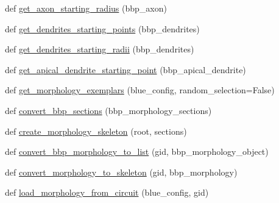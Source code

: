 \begin{DoxyCompactItemize}
\item 
def \hyperlink{classmeshy_1_1neuromorphovis_1_1file_1_1readers_1_1morphology_1_1bbp__reader_1_1BBPReader_aef70df3a247ec4976d1020a63f3874c6}{get\+\_\+axon\+\_\+starting\+\_\+radius} (bbp\+\_\+axon)
\item 
def \hyperlink{classmeshy_1_1neuromorphovis_1_1file_1_1readers_1_1morphology_1_1bbp__reader_1_1BBPReader_afdab627c045a749044be1777552adefa}{get\+\_\+dendrites\+\_\+starting\+\_\+points} (bbp\+\_\+dendrites)
\item 
def \hyperlink{classmeshy_1_1neuromorphovis_1_1file_1_1readers_1_1morphology_1_1bbp__reader_1_1BBPReader_ad09df56212d10b543856fc39b7419e80}{get\+\_\+dendrites\+\_\+starting\+\_\+radii} (bbp\+\_\+dendrites)
\item 
def \hyperlink{classmeshy_1_1neuromorphovis_1_1file_1_1readers_1_1morphology_1_1bbp__reader_1_1BBPReader_aa9c6eaf938e7bf25a5d2f07b74e6e4a2}{get\+\_\+apical\+\_\+dendrite\+\_\+starting\+\_\+point} (bbp\+\_\+apical\+\_\+dendrite)
\item 
def \hyperlink{classmeshy_1_1neuromorphovis_1_1file_1_1readers_1_1morphology_1_1bbp__reader_1_1BBPReader_a20d5f0085d3bb015351792467ae0b86c}{get\+\_\+morphology\+\_\+exemplars} (blue\+\_\+config, random\+\_\+selection=False)
\item 
def \hyperlink{classmeshy_1_1neuromorphovis_1_1file_1_1readers_1_1morphology_1_1bbp__reader_1_1BBPReader_aa026b30f503fcab7f986105ba42a1db3}{convert\+\_\+bbp\+\_\+sections} (bbp\+\_\+morphology\+\_\+sections)
\item 
def \hyperlink{classmeshy_1_1neuromorphovis_1_1file_1_1readers_1_1morphology_1_1bbp__reader_1_1BBPReader_a124b08fc4aa9b6b6eb91278b3bb6f4cf}{create\+\_\+morphology\+\_\+skeleton} (root, sections)
\item 
def \hyperlink{classmeshy_1_1neuromorphovis_1_1file_1_1readers_1_1morphology_1_1bbp__reader_1_1BBPReader_ac3e85441a850ae845261aaa790e1b8af}{convert\+\_\+bbp\+\_\+morphology\+\_\+to\+\_\+list} (gid, bbp\+\_\+morphology\+\_\+object)
\item 
def \hyperlink{classmeshy_1_1neuromorphovis_1_1file_1_1readers_1_1morphology_1_1bbp__reader_1_1BBPReader_ad427e47debb6894980687a308fb0cb1e}{convert\+\_\+morphology\+\_\+to\+\_\+skeleton} (gid, bbp\+\_\+morphology)
\item 
def \hyperlink{classmeshy_1_1neuromorphovis_1_1file_1_1readers_1_1morphology_1_1bbp__reader_1_1BBPReader_af39a1f025ee21bd4c82f87b3d47c2641}{load\+\_\+morphology\+\_\+from\+\_\+circuit} (blue\+\_\+config, gid)
\end{DoxyCompactItemize}


